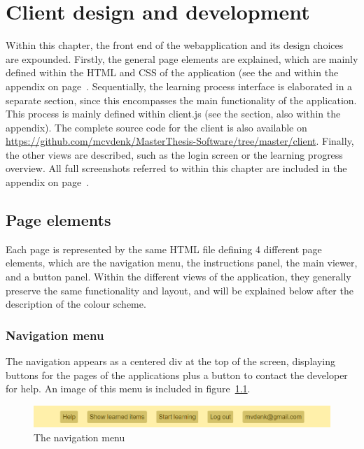 \chapter{Client design and development}
\label{ch:client}

Within this chapter, the front end of the webapplication and its design choices are expounded. Firstly, the general page elements are explained, which are mainly defined within the HTML and CSS of the application (see the  and  within the  appendix on page~\pageref{app:clientsource}. Sequentially, the learning process interface is elaborated in a separate section, since this encompasses the main functionality of the application. This process is mainly defined within client.js (see the  section, also within the  appendix). The complete source code for the client is also available on \url{https://github.com/mcvdenk/MasterThesis-Software/tree/master/client}. Finally, the other views are described, such as the login screen or the learning progress overview. All full screenshots referred to within this chapter are included in the  appendix on page~\pageref{app:clientscreenshots}.

\section{Page elements}

Each page is represented by the same HTML file defining 4 different page elements, which are the navigation menu, the instructions panel, the main viewer, and a button panel. Within the different views of the application, they generally preserve the same functionality and layout, and will be explained below after the description of the colour scheme.

\subsection{Navigation menu}

The navigation appears as a centered div at the top of the screen, displaying buttons for the pages of the applications plus a button to contact the developer for help. An image of this menu is included in figure~\ref{fig:navmenu}.

\begin{figure}
    \centering
    \includegraphics[width=.8\textwidth]{img/navmenu.png}
    \caption{The navigation menu}
    \label{fig:navmenu}
\end{figure}

